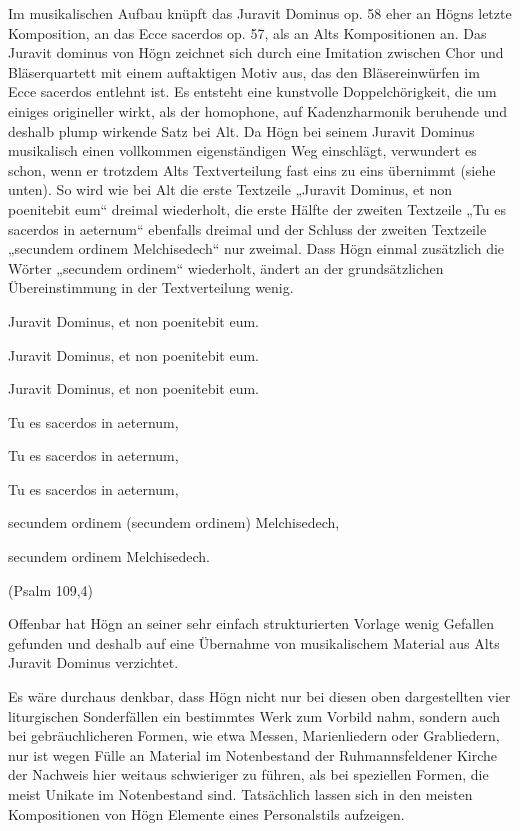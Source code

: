 Im musikalischen Aufbau knüpft das Juravit Dominus op. 58 eher an Högns
letzte Komposition, an das Ecce sacerdos op. 57, als an Alts
Kompositionen an. Das Juravit dominus von Högn zeichnet sich durch eine
Imitation zwischen Chor und Bläserquartett mit einem auftaktigen Motiv
aus, das den Bläsereinwürfen im Ecce sacerdos entlehnt ist. Es entsteht
eine kunstvolle Doppelchörigkeit, die um einiges origineller wirkt, als
der homophone, auf Kadenzharmonik beruhende und deshalb plump wirkende
Satz bei Alt. Da Högn bei seinem Juravit Dominus musikalisch einen
vollkommen eigenständigen Weg einschlägt, verwundert es schon, wenn er
trotzdem Alts Textverteilung fast eins zu eins übernimmt (siehe unten).
So wird wie bei Alt die erste Textzeile „Juravit Dominus, et non
poenitebit eum“ dreimal wiederholt, die erste Hälfte der zweiten
Textzeile „Tu es sacerdos in aeternum“ ebenfalls dreimal und der
Schluss der zweiten Textzeile „secundem ordinem Melchisedech“ nur
zweimal. Dass Högn einmal zusätzlich die Wörter „secundem ordinem“
wiederholt, ändert an der grundsätzlichen Übereinstimmung in der
Textverteilung wenig.

Juravit Dominus, et non poenitebit eum.

Juravit Dominus, et non poenitebit eum.

Juravit Dominus, et non poenitebit eum.

Tu es sacerdos in aeternum,

Tu es sacerdos in aeternum,

Tu es sacerdos in aeternum,

secundem ordinem (secundem ordinem) Melchisedech,

secundem ordinem Melchisedech.

(Psalm 109,4)

Offenbar hat Högn an seiner sehr einfach strukturierten Vorlage wenig
Gefallen gefunden und deshalb auf eine Übernahme von musikalischem
Material aus Alts Juravit Dominus verzichtet.

Es wäre durchaus denkbar, dass Högn nicht nur bei diesen oben
dargestellten vier liturgischen Sonderfällen ein bestimmtes Werk zum
Vorbild nahm, sondern auch bei gebräuchlicheren Formen, wie etwa
Messen, Marienliedern oder Grabliedern, nur ist wegen Fülle an Material
im Notenbestand der Ruhmannsfeldener Kirche der Nachweis hier weitaus
schwieriger zu führen, als bei speziellen Formen, die meist Unikate im
Notenbestand sind. Tatsächlich lassen sich in den meisten Kompositionen
von Högn Elemente eines Personalstils aufzeigen.